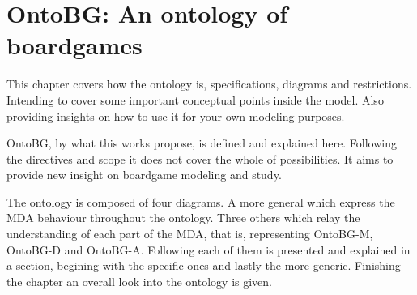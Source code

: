 \chapter{OntoBG: An ontology of boardgames}

This chapter covers how the ontology is, specifications, diagrams and restrictions. Intending to cover some important conceptual points inside the model. Also providing insights on how to use it for your own modeling purposes.

OntoBG, by what this works propose, is defined and explained here. Following the directives and scope it does not cover the whole of possibilities. It aims to provide new insight on boardgame modeling and study. 

The ontology is composed of four diagrams. A more general which express the MDA behaviour throughout the ontology. Three others which relay the understanding of each part of the MDA, that is, representing OntoBG-M, OntoBG-D and OntoBG-A. Following each of them is presented and explained in a section, begining with the specific ones and lastly the more generic. Finishing the chapter an overall look into the ontology is given.






